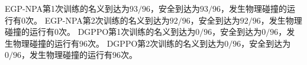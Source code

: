 EGP-NPA第1次训练的名义到达为$93/96$，安全到达为$93/96$，发生物理碰撞的运行有$0$次。
EGP-NPA第2次训练的名义到达为$92/96$，安全到达为$92/96$，发生物理碰撞的运行有$0$次。
DGPPO第1次训练的名义到达为$0/96$，安全到达为$0/96$，发生物理碰撞的运行有$96$次。
DGPPO第2次训练的名义到达为$0/96$，安全到达为$0/96$，发生物理碰撞的运行有$96$次。
